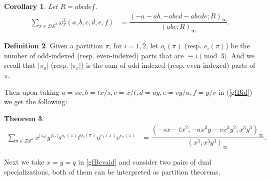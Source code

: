 \documentclass[12pt]{amsart}
\numberwithin{equation}{section}
\theoremstyle{plain}
\newtheorem{theorem}{Theorem}[section]
\newtheorem{corollary}[theorem]{Corollary}
\theoremstyle{definition}
\newtheorem{Def}[theorem]{Definition}
\begin{document}
\begin{corollary}\label{gfB} Let $R=abcdef$.
\begin{align}\label{gfBid}
\sum\limits_{\pi\in\mathcal{DS}^3}\omega^3_{\pi}(a,b,c,d,e,f)&=\dfrac{(-a-ab,-abcd-abcde;R)_{\infty}}{(abc;R)_{\infty}}.
\end{align}
\end{corollary}

\begin{Def} Given a partition $\pi$,
for $i=1,2$,  let $o_i(\pi)$ (resp. $e_i(\pi)$) be  the number of odd-indexed (resp. even-indexed) parts that are $\equiv i \pmod 3$. And we recall that $|\pi_o|$ (resp. $|\pi_e|$) is the sum of odd-indexed (resp. even-indexed) parts of $\pi$. 
\end{Def}
Then upon taking $a=sx, b=tx/s, c=x/t, d=uy, e=vy/u, f=y/v$ in (\ref{gfBid}) we get the following:
\begin{theorem}\label{gfBeva}
\begin{align}\label{gfBevaid}
\sum\limits_{\pi\in\mathcal{DS}^3}x^{|\pi_o|}y^{|\pi_e|}s^{o_1(\pi)}t^{o_2(\pi)}u^{e_1(\pi)}v^{e_2(\pi)}&=\dfrac{(-sx-tx^2,-ux^3y-vx^3y^2;x^3y^3)_{\infty}}{(x^3;x^3y^3)_{\infty}}.
\end{align}
\end{theorem}

Next we take $x=y=q$ in \eqref{gfBevaid} and consider two pairs of dual specializations, both of them can be interpreted as partition theorems.
\end{document}
